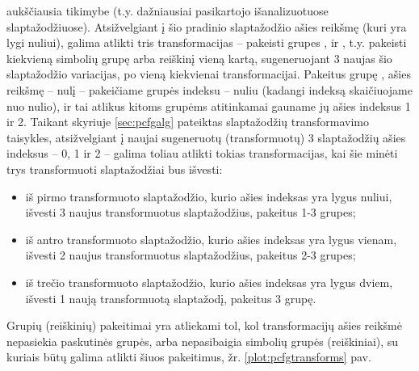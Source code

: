 \documentclass{VUMIFInfBakalaurinis}
\begin{document}
aukščiausia tikimybe (t.y. dažniausiai pasikartojo išanalizuotuose 
slaptažodžiuose). Atsižvelgiant į šio pradinio slaptažodžio ašies reikšmę (kuri 
yra lygi nuliui), galima atlikti tris transformacijas -- pakeisti grupes 
,  ir , t.y. pakeisti kiekvieną 
simbolių grupę arba reiškinį vieną kartą, sugeneruojant 3 naujas šio 
slaptažodžio variacijas, po vieną kiekvienai transformacijai. Pakeitus grupę 
, ašies reikšmę -- nulį -- pakeičiame grupės indeksu -- nuliu 
(kadangi indeksą skaičiuojame nuo nulio), ir tai atlikus kitoms grupėms 
atitinkamai gauname jų ašies indeksus 1 ir 2. Taikant skyriuje \ref{sec:pcfgalg} 
pateiktas slaptažodžių transformavimo taisykles, atsižvelgiant į naujai 
sugeneruotų (transformuotų) 3 slaptažodžių ašies indeksus -- 0, 1 ir 2 -- galima 
toliau atlikti tokias transformacijas, kai šie minėti trys transformuoti 
slaptažodžiai bus išvesti:
\begin{itemize}
  \item iš pirmo transformuoto slaptažodžio, kurio ašies indeksas yra lygus 
    nuliui, išvesti 3 naujus transformuotus slaptažodžius, pakeitus 1-3 grupes;
  \item iš antro transformuoto slaptažodžio, kurio ašies indeksas yra lygus 
    vienam, išvesti 2 naujus transformuotus slaptažodžius, pakeitus 2-3 grupes;
  \item iš trečio transformuoto slaptažodžio, kurio ašies indeksas yra lygus 
    dviem, išvesti 1 naują transformuotą slaptažodį, pakeitus 3 grupę.
\end{itemize}

Grupių (reiškinių) pakeitimai yra atliekami tol, kol transformacijų ašies 
reikšmė nepasiekia paskutinės grupės, arba nepasibaigia simbolių grupės 
(reiškiniai), su kuriais būtų galima atlikti šiuos pakeitimus, žr. 
\ref{plot:pcfgtransforms} pav.
\end{document}
